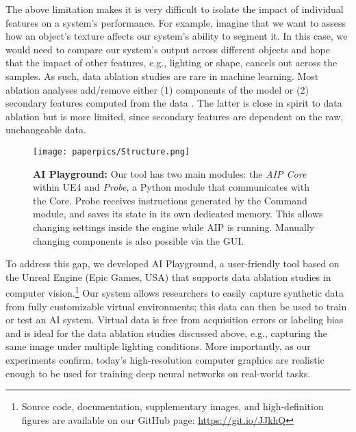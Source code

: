 \documentclass[runningheads]{llncs}
\begin{document}
The above limitation makes it is very difficult to isolate the impact of individual features on a system's performance. For example, imagine that we want to assess how an object's texture affects our system's ability to segment it. In this case, we would need to compare our system's output across different objects and hope that the impact of other features, e.g., lighting or shape, cancels out across the samples. As such, data ablation studies are rare in machine learning. Most ablation analyses add/remove either (1) components of the model \cite{2019arXiv190108644M} or (2) secondary features computed from the data \cite{2019arXiv191000174M}. The latter is close in spirit to data ablation but is more limited, since secondary features are dependent on the raw, unchangeable data.



\begin{figure}[htbp]
\centerline{\texttt{[image: paperpics/Structure.png]}}
\caption{\textbf{AI Playground:} Our tool has two main modules: the \textit{AIP Core} within UE4 and \textit{Probe}, a Python module that communicates with the Core. Probe receives instructions generated by the Command module, and saves its state in its own dedicated memory. This allows changing settings inside the engine while AIP is running. Manually changing components is also possible via the GUI.}
\label{fig:AIPStruct}
\vspace{-1em}
\end{figure}

To address this gap, we developed AI Playground, a user-friendly tool based on the Unreal Engine (Epic Games, USA) \cite{unrealengine} that supports data ablation studies in computer vision.\footnote{Source code, documentation, supplementary images, and high-definition figures are available on our GitHub page: \url{https://git.io/JJkhQ}} Our system allows researchers to easily capture synthetic data from fully customizable virtual environments; this data can then be used to train or test an AI system. Virtual data is free from acquisition errors or labeling bias and is ideal for the data ablation studies discussed above, e.g., capturing the same image under multiple lighting conditions. More importantly, as our experiments confirm, today's high-resolution computer graphics are realistic enough to be used for training deep neural networks on real-world tasks.
\end{document}
